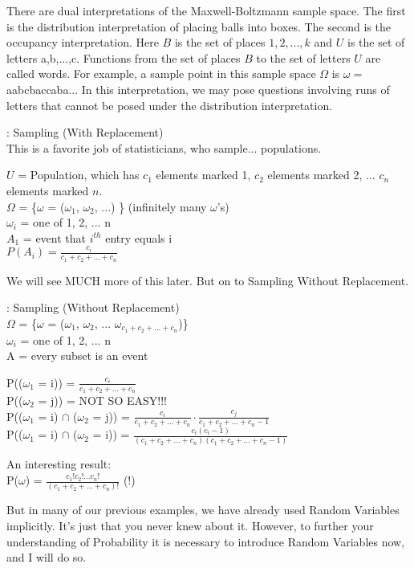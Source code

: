There are dual interpretations of the Maxwell-Boltzmann sample space. The first is the distribution interpretation of placing balls into boxes. The second is the occupancy interpretation. Here $B$ is the set of places $1,2,...,k$ and $U$ is the set of letters a,b,...,c. Functions from the set of places $B$ to the set of letters $U$  are called words. For example, a sample point in this sample space $\Omega$ is $\omega = $ aabcbaccaba... In this interpretation, we may pose questions involving runs of letters that cannot be posed under the distribution interpretation.

 : Sampling (With Replacement)\\
This is a favorite job of statisticians, who sample... populations.

$U$ = Population, which has $c_1$ elements marked 1, $c_2$ elements marked 2, ... $c_n$ elements marked $n$.\\
$\Omega$ = \{$\omega$ = ($\omega_{1}$, $\omega_{2}$, ...) \} (infinitely many $\omega$'s)\\
$\omega_{i}$ = one of 1, 2, ... n\\
$A_1$ = event that $i^{th}$ entry equals i\\
$P(A_i) = \frac {c_i}{c_1 + c_2 + ... + c_n}$

We will see MUCH more of this later.  But on to Sampling Without Replacement.

 : Sampling (Without Replacement)\\
$\Omega$ = \{$\omega$ = ($\omega_{1}$, $\omega_{2}$, ... $\omega_{c_1 + c_2 + ... + c_n}$)\}\\
$\omega_{i}$ = one of 1, 2, ... n\\
A = every subset is an event

P(($\omega_1$ = i)) = $\frac {c_i}{c_1 + c_2 + ... + c_n}$\\
P(($\omega_2$ = j)) = NOT SO EASY!!!\\
P(($\omega_1$ = i) $\cap$ ($\omega_2$ = j)) = $\frac {c_i}{c_1 + c_2 + ... + c_n} \cdot \frac {c_j}{c_1 + c_2 + ... + c_n - 1}$\\
P(($\omega_1$ = i) $\cap$ ($\omega_2$ = i)) = $\frac {c_i(c_i - 1)}{(c_1 + c_2 + ... + c_n)(c_1 + c_2 + ... + c_n - 1)}$

An interesting result$:$\\
P($\omega$) = $\frac {c_1!c_2!...c_n!}{(c_1 + c_2 + ... + c_n)!}$ (!)

But in many of our previous examples, we have already used Random Variables implicitly.  It's just that you never knew about it.  However, to further your understanding of Probability it is necessary to introduce Random Variables now, and I will do so.

